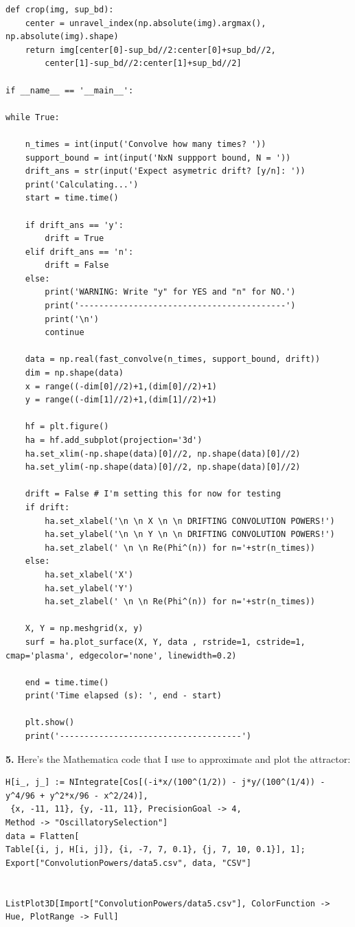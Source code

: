 \documentclass{article}
\theoremstyle{definition}
\begin{document}
\begin{lstlisting}
def crop(img, sup_bd):
	center = unravel_index(np.absolute(img).argmax(), np.absolute(img).shape)
	return img[center[0]-sup_bd//2:center[0]+sup_bd//2,
		center[1]-sup_bd//2:center[1]+sup_bd//2]

if __name__ == '__main__':

while True:

	n_times = int(input('Convolve how many times? '))
	support_bound = int(input('NxN suppport bound, N = '))
	drift_ans = str(input('Expect asymetric drift? [y/n]: '))
	print('Calculating...')
	start = time.time()

	if drift_ans == 'y':
		drift = True
	elif drift_ans == 'n':
		drift = False
	else:
		print('WARNING: Write "y" for YES and "n" for NO.')
		print('------------------------------------------')
		print('\n')
		continue

	data = np.real(fast_convolve(n_times, support_bound, drift))
	dim = np.shape(data)
	x = range((-dim[0]//2)+1,(dim[0]//2)+1)
	y = range((-dim[1]//2)+1,(dim[1]//2)+1)

	hf = plt.figure()
	ha = hf.add_subplot(projection='3d')
	ha.set_xlim(-np.shape(data)[0]//2, np.shape(data)[0]//2)
	ha.set_ylim(-np.shape(data)[0]//2, np.shape(data)[0]//2)

	drift = False # I'm setting this for now for testing
	if drift:
		ha.set_xlabel('\n \n X \n \n DRIFTING CONVOLUTION POWERS!')
		ha.set_ylabel('\n \n Y \n \n DRIFTING CONVOLUTION POWERS!')
		ha.set_zlabel(' \n \n Re(Phi^(n)) for n='+str(n_times))
	else:
		ha.set_xlabel('X')
		ha.set_ylabel('Y')
		ha.set_zlabel(' \n \n Re(Phi^(n)) for n='+str(n_times))

	X, Y = np.meshgrid(x, y)  
	surf = ha.plot_surface(X, Y, data , rstride=1, cstride=1, cmap='plasma', edgecolor='none', linewidth=0.2)

	end = time.time()
	print('Time elapsed (s): ', end - start)

	plt.show()
	print('-------------------------------------')
\end{lstlisting}



\newpage



\noindent \textbf{5.} Here's the Mathematica code that I use to approximate and plot the attractor:
\begin{lstlisting}
H[i_, j_] := NIntegrate[Cos[(-i*x/(100^(1/2)) - j*y/(100^(1/4)) - y^4/96 + y^2*x/96 - x^2/24)],
 {x, -11, 11}, {y, -11, 11}, PrecisionGoal -> 4, 
Method -> "OscillatorySelection"]
data = Flatten[
Table[{i, j, H[i, j]}, {i, -7, 7, 0.1}, {j, 7, 10, 0.1}], 1];
Export["ConvolutionPowers/data5.csv", data, "CSV"]


ListPlot3D[Import["ConvolutionPowers/data5.csv"], ColorFunction -> Hue, PlotRange -> Full]
\end{lstlisting}
\end{document}
